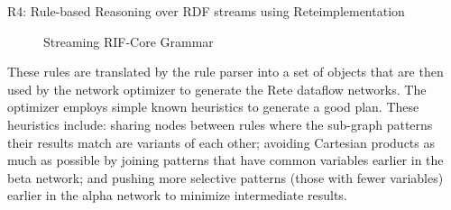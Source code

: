 \begin{nestedsection}{R4: Rule-based Reasoning over RDF streams using Rete}{implementation}
	\begin{figure}[t]
		\centering
		\begin{ebnf}
		\end{ebnf}
		\caption{Streaming RIF-Core Grammar}
	\end{figure}

	These rules are translated by the rule parser into a set of objects that are then used by the network optimizer to generate the Rete dataflow networks.
	The optimizer employs simple known heuristics to generate a good plan.
	These heuristics include: sharing nodes between rules where the sub-graph patterns their results match are variants of each other; avoiding Cartesian products as much as possible by joining patterns that have common variables earlier in the beta network; and pushing more selective patterns (those with fewer variables) earlier in the alpha network to minimize intermediate results.
	

\end{nestedsection}

